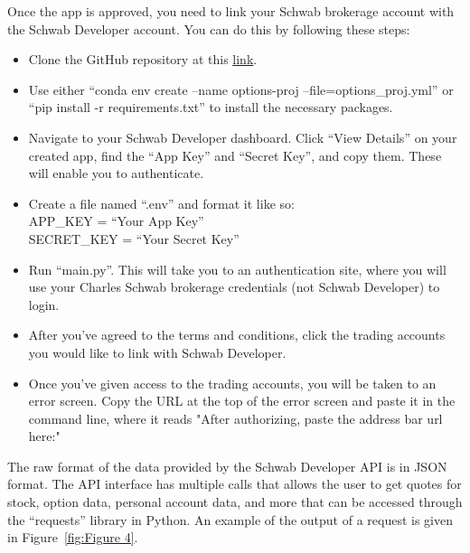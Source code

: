 \documentclass{article}
\begin{document}
\indent Once the app is approved, you need to link your Schwab brokerage account with the Schwab Developer account. You can do this by following these steps: 
\begin{itemize}
    \item Clone the GitHub repository at this \href{https://github.com/mikemartinez13/option-profit-calculator}{link}.
    \item Use either \enquote{conda env create --name options-proj --file=options\_proj.yml} or \enquote{pip install -r requirements.txt} to install the necessary packages. 
    \item Navigate to your Schwab Developer dashboard. Click \enquote{View Details} on your created app, find the \enquote{App Key} and \enquote{Secret Key}, and copy them. These will enable you to authenticate. 
    \item Create a file named \enquote{.env} and format it like so: 
    \\ APP\_KEY = \enquote{Your App Key}
    \\ SECRET\_KEY = \enquote{Your Secret Key}
    \item Run ``main.py''. This will take you to an authentication site, where you will use your Charles Schwab brokerage credentials (not Schwab Developer) to login. 
    \item After you've agreed to the terms and conditions, click the trading accounts you would like to link with Schwab Developer. 
    \item Once you've given access to the trading accounts, you will be taken to an error screen. Copy the URL at the top of the error screen and paste it in the command line, where it reads "After authorizing, paste the address bar url here:"

\end{itemize}

\indent The raw format of the data provided by the Schwab Developer API is in JSON format. The API interface has multiple calls that allows the user to get quotes for stock, option data, personal account data, and more that can be accessed through the \enquote{requests} library in Python. An example of the output of a request is given in Figure~\ref{fig:Figure 4}.
\end{document}
